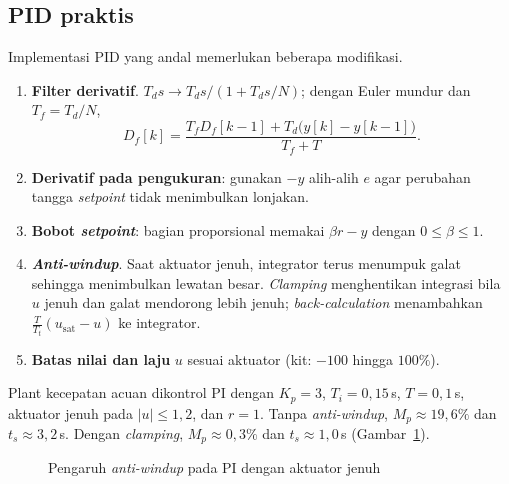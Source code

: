 \subsection{PID praktis}
Implementasi PID yang andal memerlukan beberapa modifikasi.
\begin{enumerate}
	\item \textbf{Filter derivatif}. $T_ds \rightarrow T_ds/(1 + T_ds/N)$; dengan Euler mundur dan $T_f = T_d/N$,
	\[
		D_f[k] = \frac{T_fD_f[k-1] + T_d\big(y[k]-y[k-1]\big)}{T_f + T}.
	\]
	\item \textbf{Derivatif pada pengukuran}: gunakan $-y$ alih-alih $e$ agar perubahan tangga \textit{setpoint} tidak menimbulkan lonjakan.
	\item \textbf{Bobot \textit{setpoint}}: bagian proporsional memakai $\beta r - y$ dengan $0 \le \beta \le 1$.
	\item \textbf{\textit{Anti-windup}}. Saat aktuator jenuh, integrator terus menumpuk galat sehingga menimbulkan lewatan besar. \textit{Clamping} menghentikan integrasi bila $u$ jenuh dan galat mendorong lebih jenuh; \textit{back-calculation} menambahkan $\frac{T}{T_t}(u_{\text{sat}} - u)$ ke integrator.
	\item \textbf{Batas nilai dan laju} $u$ sesuai aktuator (kit: $-100$ hingga $100\%$).
\end{enumerate}

\begin{contoh}
	Plant kecepatan acuan dikontrol PI dengan $K_p = 3$, $T_i = 0{,}15$\,s, $T = 0{,}1$\,s, aktuator jenuh pada $|u| \le 1{,}2$, dan $r = 1$. Tanpa \textit{anti-windup}, $M_p \approx 19{,}6\%$ dan $t_s \approx 3{,}2$\,s. Dengan \textit{clamping}, $M_p \approx 0{,}3\%$ dan $t_s \approx 1{,}0$\,s (Gambar~\ref{fig:b5-windup}).
\end{contoh}

\begin{figure}[H]
	\centering
	\caption{Pengaruh \textit{anti-windup} pada PI dengan aktuator jenuh}
	\label{fig:b5-windup}
\end{figure}

